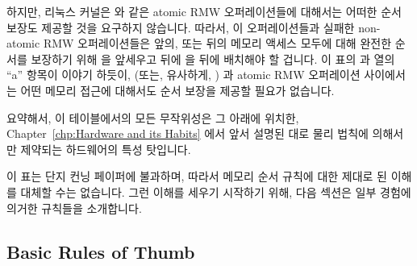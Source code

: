 {	하지만, 리눅스 커널은  와 같은  atomic RMW
	오퍼레이션들에 대해서는 어떠한 순서 보장도 제공할 것을 요구하지
	않습니다.
	따라서, 이 오퍼레이션들과 실패한 non- atomic RMW
	오퍼레이션들은 앞의, 또는 뒤의 메모리 액세스 모두에 대해 완전한 순서를
	보장하기 위해  을 앞세우고 뒤에
	 을 뒤에 배치해야 할 겁니다.
	이 표의  과 
	열의 ``a'' 항목이 이야기 하듯이,  (또는,
	유사하게, ) 과 atomic RMW 오퍼레이션
	사이에서는 어떤 메모리 접근에 대해서도 순서 보장을 제공할 필요가
	없습니다.

	요약해서, 이 테이블에서의 모든 무작위성은 그 아래에 위치한,
	Chapter~\ref{chp:Hardware and its Habits} 에서 앞서 설명된 대로 물리
	법칙에 의해서만 제약되는 하드웨어의 특성 탓입니다.

} \QuickQuizEnd

이 표는 단지 컨닝 페이퍼에 불과하며, 따라서 메모리 순서 규칙에 대한 제대로 된
이해를 대체할 수는 없습니다.
그런 이해를 세우기 시작하기 위해, 다음 섹션은 일부 경험에 의거한 규칙들을
소개합니다.

\subsection{Basic Rules of Thumb}
\label{sec:memorder:Basic Rules of Thumb}

